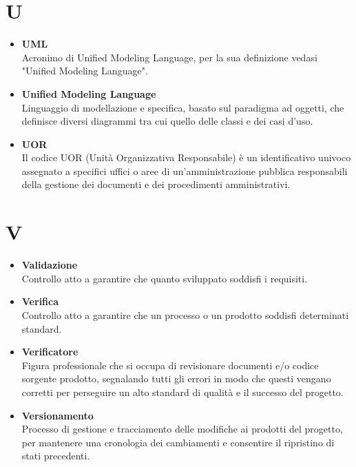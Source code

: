 \documentclass[a4paper,12pt]{article}
\begin{document}
        \section*{U} {
            \begin{itemize}
                \item \textbf{UML}\\
                    Acronimo di Unified Modeling Language, per la sua definizione vedasi "Unified Modeling Language".
                \item \textbf{Unified Modeling Language}\\
                    Linguaggio di modellazione e specifica, basato sul paradigma ad oggetti, che definisce diversi diagrammi tra cui quello delle classi e dei casi d'uso.
                \item \textbf{UOR}\\
                    Il codice UOR (Unità Organizzativa Responsabile) è un identificativo univoco assegnato a specifici uffici o aree di un'amministrazione pubblica responsabili della gestione dei documenti e dei procedimenti amministrativi. 
            \end{itemize}
        }
        \newpage

        \section*{V} {
            \begin{itemize}
                \item \textbf{Validazione}\\
                    Controllo atto a garantire che quanto sviluppato soddisfi i requisiti.
                \item \textbf{Verifica}\\
                    Controllo atto a garantire che un processo o un prodotto soddisfi determinati standard.
                \item \textbf{Verificatore}\\
                    Figura professionale che si occupa di revisionare documenti e/o codice sorgente prodotto, segnalando tutti gli errori in modo che questi vengano corretti per perseguire un alto standard di qualità e il successo del progetto.
                \item \textbf{Versionamento}\\
                    Processo di gestione e tracciamento delle modifiche ai prodotti del progetto, per mantenere una cronologia dei cambiamenti e consentire il ripristino di stati precedenti.
            \end{itemize}
        }
        \newpage
\end{document}

